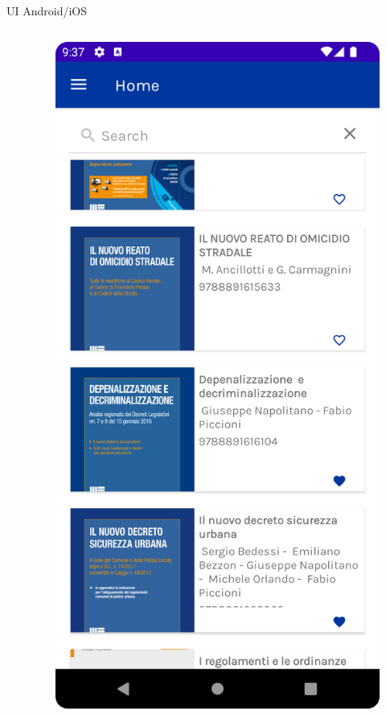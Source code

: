 \begin{frame}{UI Android/iOS}
\begin{columns}[onlytextwidth]
\begin{column}{0.14\textwidth}
        \end{column}
        \begin{column}{0.14\textwidth}
        
            \begin{figure}[H]
                \includegraphics[width=1\textwidth]{img/home.png}
            \end{figure}
            

\end{column}
\end{columns}
\end{frame}
